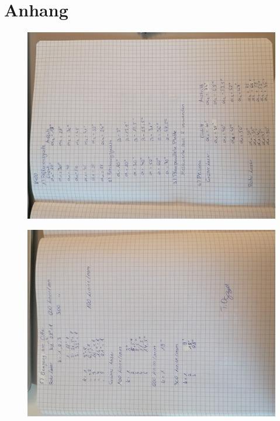 \section{Anhang}

\begin{figure}
    \centering
    \includegraphics[width=\textwidth]{content/Anhang1.jpg}
\end{figure}
    
\begin{figure}
    \centering
    \includegraphics[width=\textwidth]{content/Anhang2.jpg}
\end{figure}